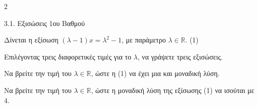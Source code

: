 \begin{ylh}{2}
    \item 3.1. Εξισώσεις 1ου Βαθμού
\end{ylh}
Δίνεται η εξίσωση $(\lambda - 1)x = \lambda^2 - 1$, με παράμετρο $\lambda \in \mathbb{R}$. (1)

\begin{alist}
\item Επιλέγοντας τρεις διαφορετικές τιμές για το $\lambda$, να γράψετε τρεις εξισώσεις.
\item

\begin{rlist}
\item Να βρείτε την τιμή του $\lambda \in \mathbb{R}$, ώστε η (1) να έχει μια και μοναδική λύση.
\item Να βρείτε την τιμή του $\lambda \in \mathbb{R}$, ώστε η μοναδική λύση της εξίσωσης (1) να ισούται με $4$.
\end{rlist}
\end{alist}

